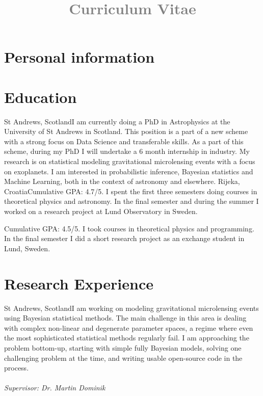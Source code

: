 \documentclass[11pt,a4paper,roman]{moderncv}
\title{\textcolor{gray}{ Curriculum Vitae}}
\begin{document}
\makecvtitle
\section{Personal information}
\section{Education}
{St Andrews, Scotland}{}{I am currently doing a PhD in Astrophysics at the University
of St Andrews in Scotland. This position is a part of a new scheme with a strong 
focus on Data Science and transferable skills. As a part of this scheme, during
my PhD I will undertake a 6 month internship in industry. My research
is on statistical modeling gravitational microlensing events with a focus on exoplanets. 
I am interested in probabilistic inference, Bayesian statistics and Machine 
Learning, both in the context of astronomy and elsewhere.}
{Rijeka, Croatia}{}{Cumulative GPA: 4.7/5. I spent the first three semesters 
doing courses in theoretical 
physics and astronomy. In the final semester and during the summer I worked on 
a research project at Lund Observatory in Sweden.}

{Cumulative GPA: 4.5/5. I took courses in theoretical physics and programming. In the final 
semester I did a short research project as an exchange student in Lund, Sweden.}
\section{Research Experience}
{St Andrews, Scotland}{}{I am working on modeling gravitational microlensing events
using Bayesian statistical methods. 
The main challenge in this area is dealing with complex non-linear and degenerate 
parameter spaces, a regime where even the most sophisticated statistical methods regularly 
fail.
I am approaching the problem bottom-up, starting with simple fully
Bayesian models, solving one challenging problem at the time, and writing usable
open-source code in the process.
\\\\
\emph{Supervisor: Dr. Martin Dominik}}
\end{document}
